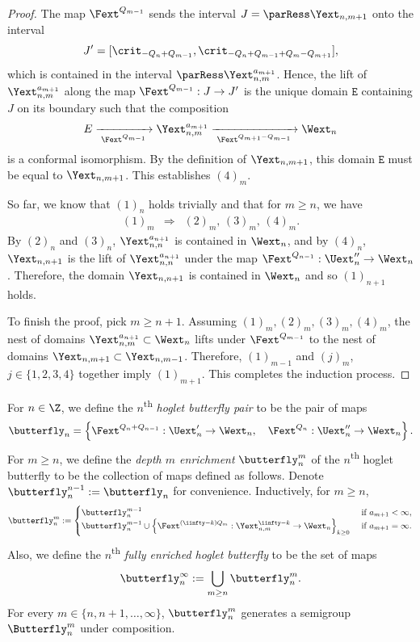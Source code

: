 \documentclass{amsart}
\begin{document}
\begin{proof}
    The map $\Fext^{Q_{m-1}}$ sends the interval $J =\parRess \Yext_{n,m+1}$ onto the interval 
    \[
    J' = [\crit_{-Q_n+Q_{m-1}},\crit_{-Q_n+Q_{m-1}+Q_{m}-Q_{m+1}}],
    \]
    which is contained in the interval $\parRess \Yext^{a_{m+1}}_{n,m}$. Hence, the lift of $\Yext^{a_{m+1}}_{n,m}$ along the map $\Fext^{Q_{m-1}}: J \to J'$ is the unique domain $\mathtt{E}$ containing $J$ on its boundary such that the composition
    \[
        E \xrightarrow[\; \Fext^{Q_{m-1}} \;]{} \Yext^{a_{m+1}}_{n,m} \xrightarrow[\; \Fext^{Q_{m+1}-Q_{m-1}} \;]{} \Wext_n
    \]
    is a conformal isomorphism. 
    By the definition of $\Yext_{n,m+1}$, this domain $\mathtt{E}$ must be equal to $\Yext_{n,m+1}$. 
    This establishes $(4)_m$.

    So far, we know that $(1)_n$ holds trivially and that for $m \geq n$, we have
    \begin{align}
        \label{eqn:1-implies-234}
        (1)_m \enspace \Longrightarrow \enspace (2)_m, \, (3)_m, \, (4)_m.
    \end{align}
    By $(2)_n$ and $(3)_n$, $\Yext^{a_{n+1}}_{n,n}$ is contained in $\Wext_n$, and by $(4)_n$, $\Yext_{n,n+1}$ is the lift of $\Yext^{a_{n+1}}_{n,n}$ under the map $\Fext^{Q_{n-1}}: \Uext''_n \to \Wext_n$.
    Therefore, the domain $\Yext_{n,n+1}$ is contained in $\Wext_n$ and so $(1)_{n+1}$ holds.
    
    To finish the proof, pick $m \geq n+1$. 
    Assuming $(1)_m, (2)_m, (3)_m, (4)_m$, the nest of domains $\Yext^{a_{n+1}}_{n,m} \subset \Wext_n$ lifts under $\Fext^{Q_{m-1}}$ to the nest of domains $\Yext_{n,m+1} \subset \Yext_{n,m-1}$. 
    Therefore, $(1)_{m-1}$ and $(j)_m$, $j \in \{1,2,3,4\}$ together imply $(1)_{m+1}$. 
    This completes the induction process.
\end{proof}

\begin{definition}
\label{def:enriched-butterfly}
    For $n \in \Z$, we define the $n$\textsuperscript{th} \emph{hoglet butterfly pair} to be the pair of maps
\[
    \butterfly_{n} = \left\{ \Fext^{Q_n+Q_{n-1}}: \Uext'_n \to \Wext_n, \quad \Fext^{Q_n}: \Uext''_n \to \Wext_n \right\}.
\]
For $m \geq n$, we define the \emph{depth $m$ enrichment} $\butterfly_n^m$ of the $n$\textsuperscript{th} hoglet butterfly to be the collection of maps defined as follows. 
Denote $\butterfly_n^{n-1} := \butterfly_n$ for convenience.
Inductively, for $m \geq n$, 
\[
    \butterfly_n^m := \begin{cases}
        \butterfly_n^{m-1} & \text{ if } a_{m+1}<\infty,\\
        \butterfly_n^{m-1} \cup \left\{ \Fext^{(\iinfty-k)Q_m}: \Yext_{n,m}^{\iinfty-k} \to \Wext_n \right\}_{k \geq 0} & \text{ if } a_{m+1}= \infty. 
    \end{cases}
\]
Also, we define the $n$\textsuperscript{th} \emph{fully enriched hoglet butterfly} to be the set of maps
\[
\butterfly_n^{\infty} := \bigcup_{m\geq n} \butterfly_n^{m}.
\]
For every $m \in \{n,n+1,\ldots,\infty\}$, $\butterfly_n^{m}$ generates a semigroup $\Butterfly_n^{m}$ under composition. 
\end{definition}
\end{document}
